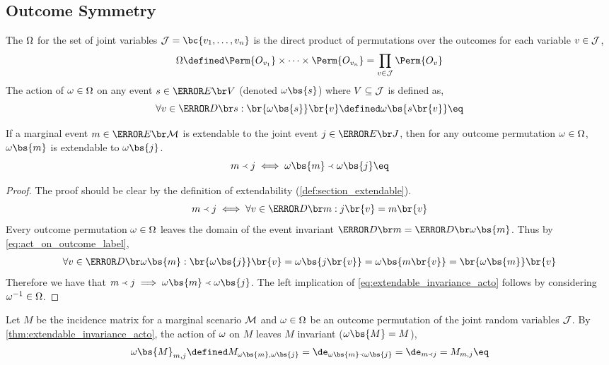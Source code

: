 \documentclass[aps, 10pt, english, twoside, pra, nofootinbib, longbibliography]{revtex4-1}
\begin{document}
    \subsection{Outcome Symmetry}
    \label{sec:outome_label_symmetry}
    \begin{definition}
        The  $\Omega$ for the set of joint variables $\jointvar = \bc{v_1, \ldots, v_n}$ is the direct product of permutations over the outcomes for each variable $v \in \mathcal{J}$,
        \[ \go \defined \Perm{O_{v_1}} \times \cdots \times \Perm{O_{v_n}} = \prod_{v \in \jointvar} \Perm{O_{v}} \]
        The action of $\omega \in \Omega$ on any event $s \in \Events{V}$ (denoted $\geo\bs{s}$) where $V \subseteq \mathcal{J}$ is defined as,
        \[ \forall v \in \Dom{s} : \br{\geo\bs{s}}\br{v} \defined \geo\bs{s\br{v}} \eq \label{eq:act_on_outcome_label}\]
    \end{definition}
    \begin{theorem}
        \label{thm:extendable_invariance_acto}
        If a marginal event $m \in \Events{\mscenario}$ is extendable to the joint event $j \in \Events{J}$, then for any outcome permutation $\omega \in \Omega$, $\geo\bs{m}$ is extendable to $\geo\bs{j}$.
        \[ m \ext j \iff \geo\bs{m} \ext \geo\bs{j} \eq \label{eq:extendable_invariance_acto}\]
    \end{theorem}
    \begin{proof}
        The proof should be clear by the definition of extendability (\cref{def:section_extendable}).
        \[ m \ext j \iff \forall v \in \Dom{m} : j\br{v} = m\br{v} \]
        Every outcome permutation $\omega \in \Omega$ leaves the domain of the event invariant $\Dom{m} = \Dom{\geo\bs{m}}$. Thus by \cref{eq:act_on_outcome_label},
        \begin{align*}
        \forall v \in \Dom{\geo\bs{m}}: \br{\geo\bs{j}}\br{v} = \geo\bs{j\br{v}} = \geo\bs{m\br{v}} = \br{\geo\bs{m}}\br{v}
        \end{align*}
        Therefore we have that $m \ext j \implies \geo\bs{m} \ext \geo\bs{j}$. The left implication of \cref{eq:extendable_invariance_acto} follows by considering $\omega^{-1} \in \Omega$.
    \end{proof}
    \begin{corollary}
        \label{coll:incidence_invariance}
        Let $M$ be the incidence matrix for a marginal scenario $\mathcal{M}$ and $\omega \in \Omega$ be an outcome permutation of the joint random variables $\mathcal{J}$. By \cref{thm:extendable_invariance_acto}, the action of $\omega$ on $M$ leaves $M$ invariant ($\geo\bs{M} = M$),
        \[ \geo\bs{M}_{m,j} \defined M_{\geo\bs{m},\geo\bs{j}} = \de_{\geo\bs{m} \ext \geo\bs{j}} = \de_{m \ext j} = M_{m,j} \eq \label{eq:incidence_invariance}\]
    \end{corollary}
\end{document}
